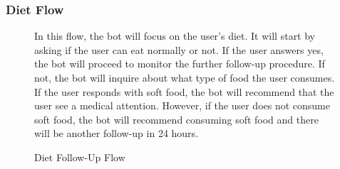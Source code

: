 \documentclass[12pt,oneside,openright,a4paper]{cpe-english-project}
\begin{document}
        \subsubsection{Diet  Flow}
          \begin{figure}[!h]
            \centering
            \caption{Diet Follow-Up Flow}\label{fig:FollowUpFlow5}
            \begin{flushleft}
              \qquad In this flow, the bot will focus on the user's diet. It will start by asking if the user can eat normally or not. If the user answers yes,  the bot will proceed to monitor the further follow-up procedure. If not, the bot will inquire about what type of food the user consumes. If the user responds with soft food, the bot will recommend that the user see a medical attention. However, if the user does not consume soft food, the bot will recommend consuming soft food and there will be another follow-up in 24 hours.\par
            \end{flushleft}        
          \end{figure}
\end{document}
